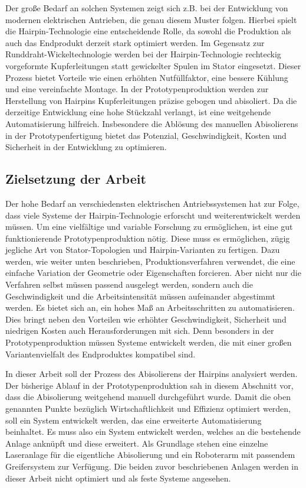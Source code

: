 Der große Bedarf an solchen Systemen zeigt sich z.B. bei der Entwicklung von modernen elektrischen Antrieben,
die genau diesem Muster folgen. Hierbei spielt die Hairpin-Technologie eine entscheidende Rolle, da sowohl die
Produktion als auch das Endprodukt derzeit stark optimiert werden. Im Gegensatz zur
Runddraht-Wickeltechnologie werden bei der Hairpin-Technologie rechteckig vorgeformte
Kupferleitungen statt gewickelter Spulen im Stator eingesetzt. Dieser Prozess bietet Vorteile
wie einen erhöhten Nutfüllfaktor, eine bessere Kühlung und eine vereinfachte Montage. In der
Prototypenproduktion werden zur Herstellung von Hairpins Kupferleitungen präzise gebogen
und abisoliert. Da die derzeitige Entwicklung eine hohe Stückzahl verlangt, ist eine
weitgehende Automatisierung hilfreich. Insbesondere die Ablösung des manuellen
Abisolierens in der Prototypenfertigung bietet das Potenzial, Geschwindigkeit, Kosten und
Sicherheit in der Entwicklung zu optimieren.

\subsection{Zielsetzung der Arbeit}\label{sec:Zielsetzung}
Der hohe Bedarf an verschiedensten elektrischen Antriebssystemen hat zur Folge, dass viele
Systeme der Hairpin-Technologie erforscht und weiterentwickelt werden müssen. Um eine vielfältige
und variable Forschung zu ermöglichen, ist eine gut funktionierende Prototypenproduktion nötig.
Diese muss es ermöglichen, zügig jegliche Art von Stator-Topologien und Hairpin-Varianten zu
fertigen. Dazu werden, wie weiter unten beschrieben, Produktionsverfahren verwendet, die eine
einfache Variation der Geometrie oder Eigenschaften forcieren. Aber nicht nur die Verfahren selbst müssen passend
ausgelegt werden, sondern auch die Geschwindigkeit und die Arbeitsintensität müssen aufeinander
abgestimmt werden. Es bietet sich an, ein hohes Maß an Arbeitsschritten zu automatisieren.
Dies bringt neben den Vorteilen wie erhöhter Geschwindigkeit, Sicherheit und niedrigen Kosten auch
Herausforderungen mit sich. Denn besonders in der Prototypenproduktion
müssen Systeme entwickelt werden, die mit einer großen Variantenvielfalt des Endproduktes kompatibel sind.

In dieser Arbeit soll der Prozess des Abisolierens der Hairpins analysiert werden.
Der bisherige Ablauf in der Prototypenproduktion sah in diesem Abschnitt vor, dass die Abisolierung weitgehend
manuell durchgeführt wurde. Damit die oben genannten Punkte bezüglich Wirtschaftlichkeit und Effizienz
optimiert werden, soll ein System entwickelt werden, das eine erweiterte Automatisierung beinhaltet.
Es muss also ein System entwickelt werden, welches an die bestehende Anlage anknüpft und diese erweitert.
Als Grundlage stehen eine einzelne Laseranlage für die eigentliche Abisolierung und ein Roboterarm
mit passendem Greifersystem zur Verfügung. Die beiden zuvor beschriebenen Anlagen werden in dieser
Arbeit nicht optimiert und als feste Systeme angesehen.

